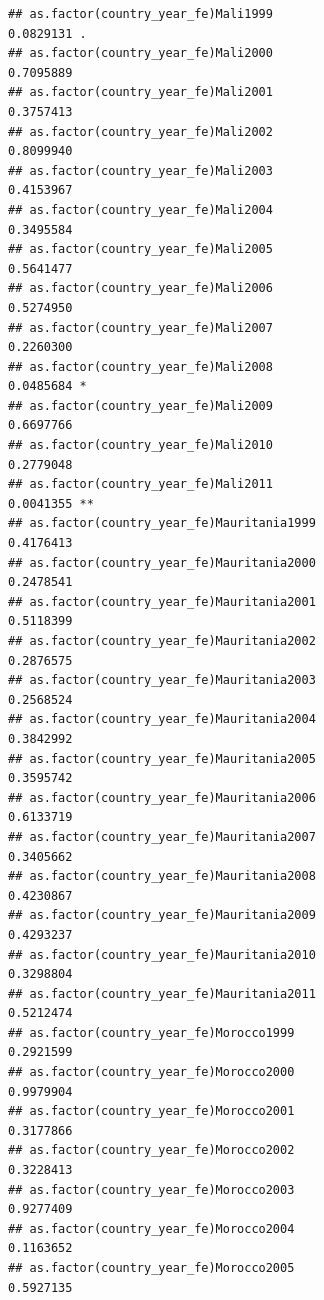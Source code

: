 \documentclass[
  a4paper,
]{article}
\begin{document}
\begin{verbatim}
## as.factor(country_year_fe)Mali1999                             0.0829131 .  
## as.factor(country_year_fe)Mali2000                             0.7095889    
## as.factor(country_year_fe)Mali2001                             0.3757413    
## as.factor(country_year_fe)Mali2002                             0.8099940    
## as.factor(country_year_fe)Mali2003                             0.4153967    
## as.factor(country_year_fe)Mali2004                             0.3495584    
## as.factor(country_year_fe)Mali2005                             0.5641477    
## as.factor(country_year_fe)Mali2006                             0.5274950    
## as.factor(country_year_fe)Mali2007                             0.2260300    
## as.factor(country_year_fe)Mali2008                             0.0485684 *  
## as.factor(country_year_fe)Mali2009                             0.6697766    
## as.factor(country_year_fe)Mali2010                             0.2779048    
## as.factor(country_year_fe)Mali2011                             0.0041355 ** 
## as.factor(country_year_fe)Mauritania1999                       0.4176413    
## as.factor(country_year_fe)Mauritania2000                       0.2478541    
## as.factor(country_year_fe)Mauritania2001                       0.5118399    
## as.factor(country_year_fe)Mauritania2002                       0.2876575    
## as.factor(country_year_fe)Mauritania2003                       0.2568524    
## as.factor(country_year_fe)Mauritania2004                       0.3842992    
## as.factor(country_year_fe)Mauritania2005                       0.3595742    
## as.factor(country_year_fe)Mauritania2006                       0.6133719    
## as.factor(country_year_fe)Mauritania2007                       0.3405662    
## as.factor(country_year_fe)Mauritania2008                       0.4230867    
## as.factor(country_year_fe)Mauritania2009                       0.4293237    
## as.factor(country_year_fe)Mauritania2010                       0.3298804    
## as.factor(country_year_fe)Mauritania2011                       0.5212474    
## as.factor(country_year_fe)Morocco1999                          0.2921599    
## as.factor(country_year_fe)Morocco2000                          0.9979904    
## as.factor(country_year_fe)Morocco2001                          0.3177866    
## as.factor(country_year_fe)Morocco2002                          0.3228413    
## as.factor(country_year_fe)Morocco2003                          0.9277409    
## as.factor(country_year_fe)Morocco2004                          0.1163652    
## as.factor(country_year_fe)Morocco2005                          0.5927135    

\end{verbatim}
\end{document}
